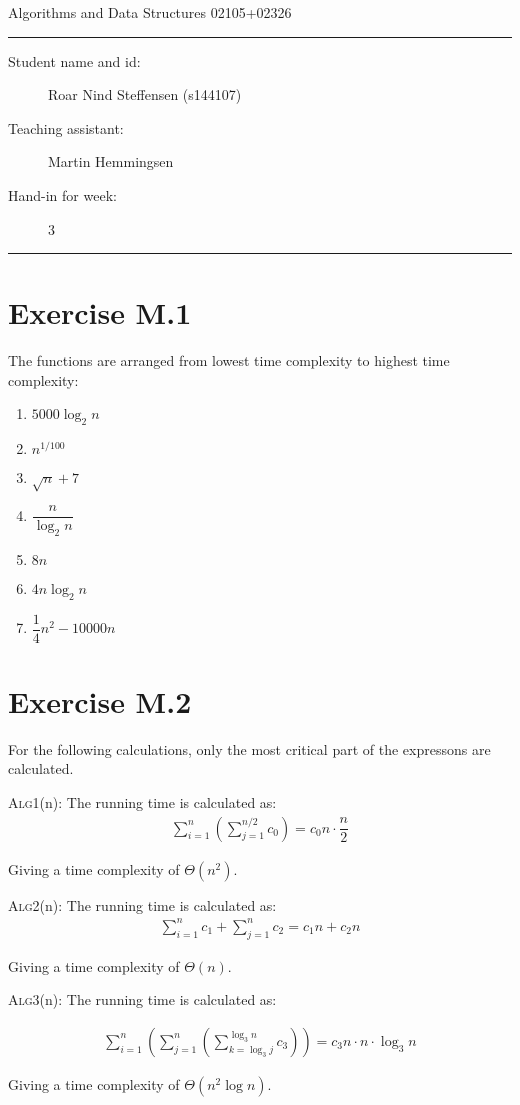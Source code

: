\documentclass[11pt]{article}
\begin{document}
\begin{center}
{{\Large \sc Algorithms and Data Structures 02105+02326}}
\end{center}
\rule{\textwidth}{1pt}
\begin{description}
\item[Student name and id:] Roar Nind Steffensen (s144107)
\item[Teaching assistant:] Martin Hemmingsen
\item[Hand-in for week:] 3
\end{description}
\rule{\textwidth}{1pt}
 

\section*{Exercise M.1}
The functions are arranged from lowest time complexity to highest time complexity:
\begin{enumerate}
    \item $5000 \log_2 n$
    \item $n^{1/100}$
    \item $\sqrt{n}+7$
    \item $\dfrac{n}{\log_2 n}$
    \item $8n$
    \item $4 n \log_2 n$
    \item $\dfrac{1}{4}n^2 - 10000 n$
\end{enumerate}


\section*{Exercise M.2}

For the following calculations, only the most critical part of the expressons are calculated.

\textsc{Alg1}(n):
The running time is calculated as: 
\begin{gather*}
    \sum_{i=1}^{n} \left( \sum_{j=1}^{n/2} c_0 \right) = c_0 n \cdot \dfrac{n}{2}
\end{gather*}

Giving a time complexity of $\Theta(n^2)$.


\textsc{Alg2}(n):
The running time is calculated as: 
\begin{gather*}
    \sum_{i=1}^{n} c_1  +  \sum_{j=1}^{n} c_2  = c_1 n + c_2 n
\end{gather*}

Giving a time complexity of $\Theta(n)$.

\textsc{Alg3}(n):
The running time is calculated as: 

\begin{gather*}
    \sum_{i=1}^{n} \left( \sum_{j=1}^{n} \left( \sum_{k=\log_3 j}^{\log_3 n} c_3 \right) \right) = c_3 n \cdot n \cdot \log_3 n
\end{gather*}

Giving a time complexity of $\Theta(n^2\log n)$.
\end{document}

